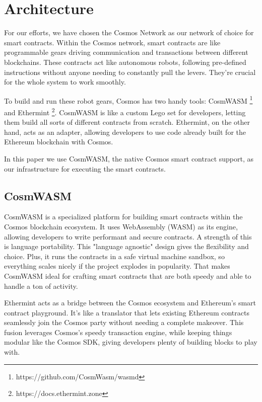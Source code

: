 \section{Architecture}

For our efforts, we have chosen the Cosmos Network\cite{kwon2019cosmos} as our network of choice for smart contracts. Within the Cosmos network, smart contracts are like programmable gears driving communication and transactions between different blockchains. These contracts act like autonomous robots, following pre-defined instructions without anyone needing to constantly pull the levers. They're crucial for the whole system to work smoothly.

To build and run these robot gears, Cosmos has two handy tools: CosmWASM \footnote{https://github.com/CosmWasm/wasmd} and Ethermint \footnote{https://docs.ethermint.zone}. CosmWASM is like a custom Lego set for developers, letting them build all sorts of different contracts from scratch. Ethermint, on the other hand, acts as an adapter, allowing developers to use code already built for the Ethereum blockchain with Cosmos.

In this paper we use CosmWASM, the native Cosmos smart contract support, as our infrastructure for executing the smart contracts.

\subsection{CosmWASM}

CosmWASM is a specialized platform for building smart contracts within the Cosmos blockchain ecosystem. It uses WebAssembly (WASM) as its engine, allowing developers to write performant and secure contracts. A strength of this is language portability. This "language agnostic" design gives the flexibility and choice. Plus, it runs the contracts in a safe virtual machine sandbox, so everything scales nicely if the project explodes in popularity. That makes CosmWASM ideal for crafting smart contracts that are both speedy and able to handle a ton of activity.

Ethermint acts as a bridge between the Cosmos ecosystem and Ethereum's smart contract playground. It's like a translator that lets existing Ethereum contracts seamlessly join the Cosmos party without needing a complete makeover. This fusion leverages Cosmos's speedy transaction engine, while keeping things modular like the Cosmos SDK, giving developers plenty of building blocks to play with.

